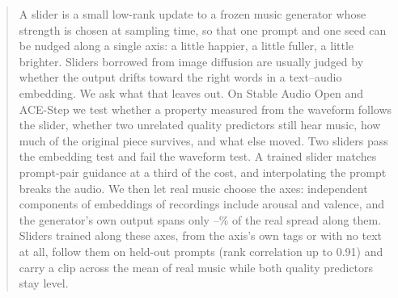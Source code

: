 \begin{abstract}
A slider is a small low-rank update to a frozen music generator whose strength is chosen at sampling time, so that one prompt and one seed can be nudged along a single axis: a little happier, a little fuller, a little brighter. Sliders borrowed from image diffusion are usually judged by whether the output drifts toward the right words in a text--audio embedding. We ask what that leaves out. On Stable Audio Open and ACE-Step we test whether a property measured from the waveform follows the slider, whether two unrelated quality predictors still hear music, how much of the original piece survives, and what else moved. Two sliders pass the embedding test and fail the waveform test. A trained slider matches prompt-pair guidance at a third of the cost, and interpolating the prompt breaks the audio. We then let real music choose the axes: independent components of embeddings of \covReal{} recordings include arousal and valence, and the generator's own output spans only \covLo{}--\covHi{}\% of the real spread along them. Sliders trained along these axes, from the axis's own tags or with no text at all, follow them on held-out prompts (rank correlation up to 0.91) and carry a clip across the mean of real music while both quality predictors stay level.
\end{abstract}
